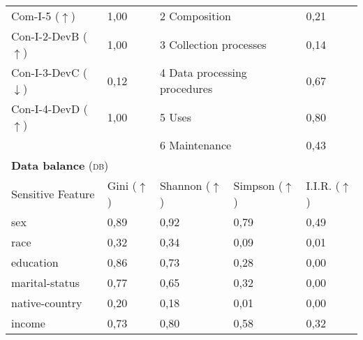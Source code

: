 \begin{table}[h]
\begin{tabular}{|p{3cm}|p{1.9cm}p{3cm}p{2.6cm}p{1.6cm}|}
        Com-I-5 ($\uparrow$) & 1,00\cellcolor[HTML]{FFFFFF} & \multicolumn{2}{|l|}{2 Composition} & 0,21\cellcolor[HTML]{FCA990} \\
        Con-I-2-DevB ($\uparrow$) & 1,00\cellcolor[HTML]{FFFFFF} & \multicolumn{2}{|l|}{3 Collection processes} & 0,14\cellcolor[HTML]{FCA186} \\
        Con-I-3-DevC ($\downarrow$) & 0,12\cellcolor[HTML]{FEF1ED} & \multicolumn{2}{|l|}{4 Data processing procedures} & 0,67\cellcolor[HTML]{FEDAD0} \\
        Con-I-4-DevD ($\uparrow$) & 1,00\cellcolor[HTML]{FFFFFF} & \multicolumn{2}{|l|}{5 Uses} & 0,80\cellcolor[HTML]{FEE9E2} \\ 
         & & \multicolumn{2}{|l|}{6 Maintenance} & 0,43\cellcolor[HTML]{FDC0AE} \\ \hline
        \multicolumn{5}{|l|}{\textbf{Data balance} (\textsc{db})} \\ \hline 
 		Sensitive Feature & Gini ($\uparrow$) & Shannon ($\uparrow$) & Simpson ($\uparrow$) & I.I.R. ($\uparrow$) \\ \hline
        sex & 0,89 & 0,92 & 0,79 & 0,49 \\
		race & 0,32\cellcolor[HTML]{fc8d59} & 0,34\cellcolor[HTML]{fc8d59} & 0,09\cellcolor[HTML]{fc8d59} & 0,01\cellcolor[HTML]{fc8d59} \\
		education & 0,86 & 0,73 & 0,28\cellcolor[HTML]{fc8d59} & 0,00\cellcolor[HTML]{fc8d59} \\
		marital-status & 0,77 & 0,65 & 0,32 & 0,00\cellcolor[HTML]{fc8d59} \\
		native-country & 0,20\cellcolor[HTML]{fc8d59} & 0,18\cellcolor[HTML]{fc8d59} & 0,01\cellcolor[HTML]{fc8d59} & 0,00\cellcolor[HTML]{fc8d59} \\
		income & 0,73 & 0,80 & 0,58 & 0,32 \\
		 \hline
    \end{tabular}
\end{table}